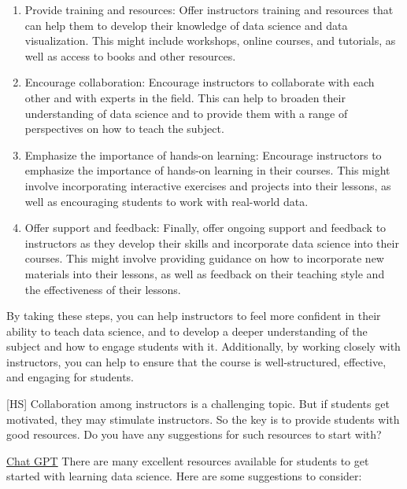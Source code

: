 \documentclass[
]{bxjsbook}
\providecommand{\tightlist}{%
  \setlength{\itemsep}{0pt}\setlength{\parskip}{0pt}}
\theoremstyle{definition}
\theoremstyle{definition}
\theoremstyle{definition}
\theoremstyle{definition}
\theoremstyle{remark}
\begin{document}
\begin{enumerate}
\def\labelenumi{\arabic{enumi}.}
\tightlist
\item
  Provide training and resources: Offer instructors training and resources that can help them to develop their knowledge of data science and data visualization. This might include workshops, online courses, and tutorials, as well as access to books and other resources.
\item
  Encourage collaboration: Encourage instructors to collaborate with each other and with experts in the field. This can help to broaden their understanding of data science and to provide them with a range of perspectives on how to teach the subject.
\item
  Emphasize the importance of hands-on learning: Encourage instructors to emphasize the importance of hands-on learning in their courses. This might involve incorporating interactive exercises and projects into their lessons, as well as encouraging students to work with real-world data.
\item
  Offer support and feedback: Finally, offer ongoing support and feedback to instructors as they develop their skills and incorporate data science into their courses. This might involve providing guidance on how to incorporate new materials into their lessons, as well as feedback on their teaching style and the effectiveness of their lessons.
\end{enumerate}

By taking these steps, you can help instructors to feel more confident in their ability to teach data science, and to develop a deeper understanding of the subject and how to engage students with it. Additionally, by working closely with instructors, you can help to ensure that the course is well-structured, effective, and engaging for students.

{[}HS{]} Collaboration among instructors is a challenging topic. But if students get motivated, they may stimulate instructors. So the key is to provide students with good resources. Do you have any suggestions for such resources to start with?

\protect\hyperlink{chatgpt}{Chat GPT} There are many excellent resources available for students to get started with learning data science. Here are some suggestions to consider:
\end{document}
